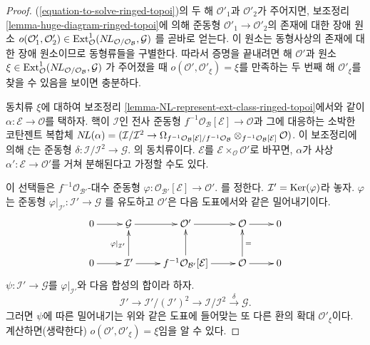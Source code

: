 \begin{proof}
(\ref{equation-to-solve-ringed-topoi})의 두 해 $\mathcal{O}'_1$과
$\mathcal{O}'_2$가 주어지면, 보조정리
\ref{lemma-huge-diagram-ringed-topoi}에 의해 준동형
$\mathcal{O}'_1 \to \mathcal{O}'_2$의 존재에 대한 장애 원소
$o(\mathcal{O}'_1, \mathcal{O}'_2) \in \mathop{\mathrm{Ext}}\nolimits^1_\mathcal{O}(
\mathop{N\!L}\nolimits_{\mathcal{O}/\mathcal{O}_\mathcal{B}}, \mathcal{G})$
를 곧바로 얻는다. 이 원소는 동형사상의 존재에 대한 장애 원소이므로
동형류들을 구별한다. 따라서 증명을 끝내려면 해 $\mathcal{O}'$과 원소
$\xi \in \mathop{\mathrm{Ext}}\nolimits^1_\mathcal{O}(
\mathop{N\!L}\nolimits_{\mathcal{O}/\mathcal{O}_\mathcal{B}}, \mathcal{G})$
가 주어졌을 때 $o(\mathcal{O}', \mathcal{O}'_\xi) = \xi$를 만족하는
두 번째 해 $\mathcal{O}'_\xi$를 찾을 수 있음을 보이면 충분하다.

\medskip\noindent
동치류 $\xi$에 대하여 보조정리
\ref{lemma-NL-represent-ext-class-ringed-topoi}에서와 같이
$\alpha : \mathcal{E} \to \mathcal{O}$를 택하자. 핵이
$\mathcal{I}$인 전사 준동형
$f^{-1}\mathcal{O}_\mathcal{B}[\mathcal{E}] \to \mathcal{O}$과 그에
대응하는 소박한 코탄젠트 복합체
$\mathop{N\!L}\nolimits(\alpha) = (\mathcal{I}/\mathcal{I}^2 \to
\Omega_{f^{-1}\mathcal{O}_\mathcal{B}[\mathcal{E}]/
f^{-1}\mathcal{O}_\mathcal{B}}
\otimes_{f^{-1}\mathcal{O}_\mathcal{B}[\mathcal{E}]} \mathcal{O})$.
이 보조정리에 의해 $\xi$는 준동형
$\delta : \mathcal{I}/\mathcal{I}^2 \to \mathcal{G}$.
의 동치류이다. $\mathcal{E}$를
$\mathcal{E} \times_\mathcal{O} \mathcal{O}'$로 바꾸면, $\alpha$가
사상 $\alpha' : \mathcal{E} \to \mathcal{O}'$를 거쳐 분해된다고
가정할 수도 있다.

\medskip\noindent
이 선택들은 $f^{-1}\mathcal{O}_{\mathcal{B}'}$-대수 준동형
$\varphi : \mathcal{O}_{\mathcal{B}'}[\mathcal{E}] \to \mathcal{O}'$.
를 정한다. $\mathcal{I}' = \mathop{\mathrm{Ker}}(\varphi)$라 놓자. $\varphi$는 준동형
$\varphi|_{\mathcal{I}'} : \mathcal{I}' \to \mathcal{G}$
를 유도하고 $\mathcal{O}'$은 다음 도표에서와 같은 밀어내기이다.
$$
\xymatrix{
0 \ar[r] & \mathcal{G} \ar[r] & \mathcal{O}' \ar[r] &
\mathcal{O} \ar[r] & 0 \\
0 \ar[r] & \mathcal{I}' \ar[u]^{\varphi|_{\mathcal{I}'}} \ar[r] &
f^{-1}\mathcal{O}_{\mathcal{B}'}[\mathcal{E}] \ar[u] \ar[r] &
\mathcal{O} \ar[u]_{=} \ar[r] & 0
}
$$
$\psi : \mathcal{I}' \to \mathcal{G}$를
$\varphi|_{\mathcal{I}'}$와 다음 합성의 합이라 하자.
$$
\mathcal{I}' \to \mathcal{I}'/(\mathcal{I}')^2 \to
\mathcal{I}/\mathcal{I}^2 \xrightarrow{\delta} \mathcal{G}.
$$
그러면 $\psi$에 따른 밀어내기는 위와 같은 도표에 들어맞는 또 다른
환의 확대 $\mathcal{O}'_\xi$이다. 계산하면(생략한다)
$o(\mathcal{O}', \mathcal{O}'_\xi) = \xi$임을 알 수 있다.
\end{proof}

